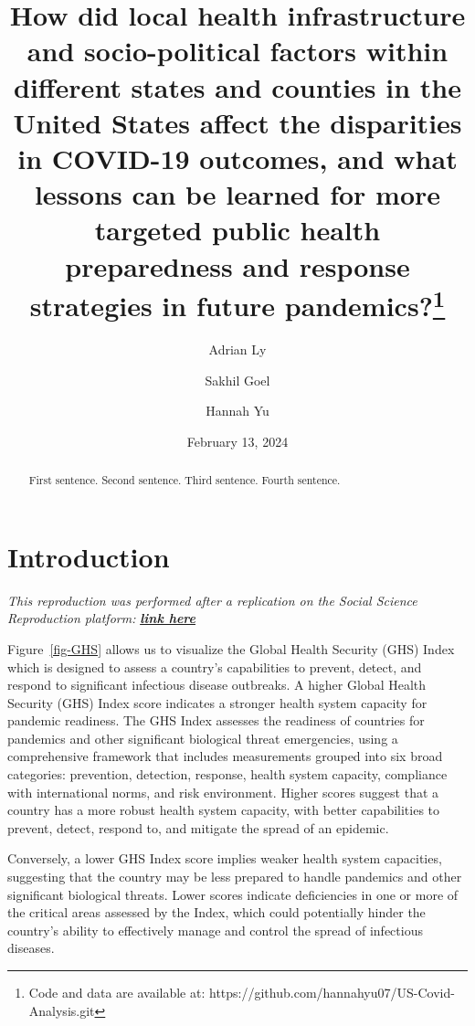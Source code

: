 \documentclass[
  letterpaper,
  DIV=11,
  numbers=noendperiod]{scrartcl}
\title{How did local health infrastructure and socio-political factors
within different states and counties in the United States affect the
disparities in COVID-19 outcomes, and what lessons can be learned for
more targeted public health preparedness and response strategies in
future pandemics?\thanks{Code and data are available at:
https://github.com/hannahyu07/US-Covid-Analysis.git}}
\author{Adrian Ly \and Sakhil Goel \and Hannah Yu}
\date{February 13, 2024}
\renewcommand*\contentsname{Table of contents}
\newcommand\contentsname{Table of contents}
\begin{document}
\maketitle
\begin{abstract}
First sentence. Second sentence. Third sentence. Fourth sentence.
\end{abstract}
\ifdefined\Shaded\renewenvironment{Shaded}{\begin{tcolorbox}[breakable, borderline west={3pt}{0pt}{shadecolor}, boxrule=0pt, frame hidden, enhanced, interior hidden, sharp corners]}{\end{tcolorbox}}\fi

\renewcommand*\contentsname{Table of contents}
{
\hypersetup{linkcolor=}
\setcounter{tocdepth}{3}
\tableofcontents
}
\hypertarget{introduction}{%
\section{Introduction}\label{introduction}}

\emph{This reproduction was performed after a replication on the Social
Science Reproduction platform:
}\textbf{\emph{\href{https://www.socialsciencereproduction.org/reproductions/c35e8e98-762d-4c00-a1a3-544ed0b2008d/index}{link
here}}}

Figure~\ref{fig-GHS} allows us to visualize the Global Health Security
(GHS) Index which is designed to assess a country's capabilities to
prevent, detect, and respond to significant infectious disease
outbreaks. A higher Global Health Security (GHS) Index score indicates a
stronger health system capacity for pandemic readiness. The GHS Index
assesses the readiness of countries for pandemics and other significant
biological threat emergencies, using a comprehensive framework that
includes measurements grouped into six broad categories: prevention,
detection, response, health system capacity, compliance with
international norms, and risk environment. Higher scores suggest that a
country has a more robust health system capacity, with better
capabilities to prevent, detect, respond to, and mitigate the spread of
an epidemic.

Conversely, a lower GHS Index score implies weaker health system
capacities, suggesting that the country may be less prepared to handle
pandemics and other significant biological threats. Lower scores
indicate deficiencies in one or more of the critical areas assessed by
the Index, which could potentially hinder the country's ability to
effectively manage and control the spread of infectious diseases.
\end{document}
